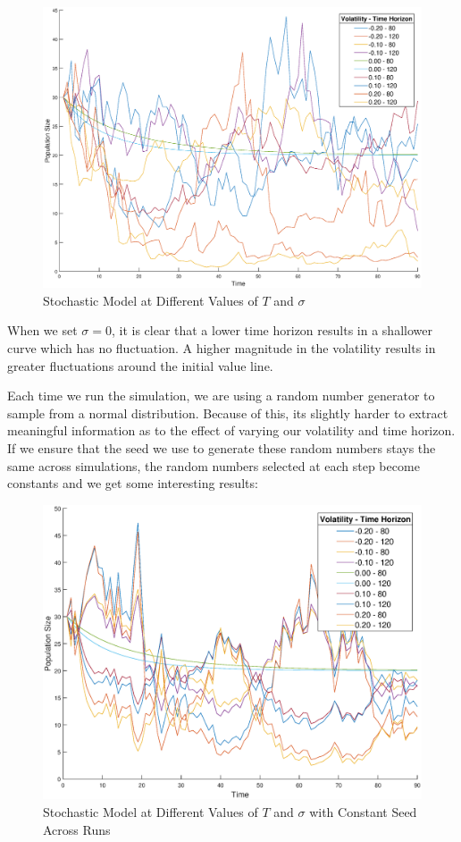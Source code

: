 \documentclass[]{report}
\begin{document}
	\begin{figure}[h]
		\centering
		\includegraphics[scale=0.29]{stochastic_model.eps}
		\caption{Stochastic Model at Different Values of $T$ and $\sigma$}
	\end{figure}

	When we set $\sigma = 0$, it is clear that a lower time horizon results in a shallower curve which has no fluctuation. A higher magnitude in the volatility results in greater fluctuations around the initial value line.
	
	Each time we run the simulation, we are using a random number generator to sample from a normal distribution. Because of this, its slightly harder to extract meaningful information as to the effect of varying our volatility and time horizon. If we ensure that the seed we use to generate these random numbers stays the same across simulations, the random numbers selected at each step become constants and we get some interesting results:
	
	\begin{figure}[h]
		\centering
		\includegraphics[scale=0.35]{stochastic_model_const.eps}
		\caption{Stochastic Model at Different Values of $T$ and $\sigma$ with Constant Seed Across Runs}
	\end{figure}
\end{document}
